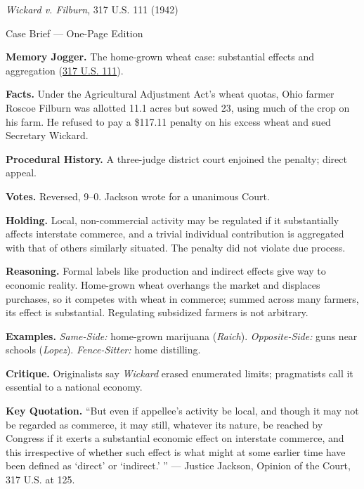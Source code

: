 \documentclass[12pt]{article}
\begin{document}
\begin{center}
{\Large \textit{Wickard v. Filburn}, 317 U.S. 111 (1942)\par}
\vspace{0.3em}
{\normalsize Case Brief --- One-Page Edition\par}
\end{center}

\textbf{Memory Jogger.} The home-grown wheat case: substantial effects and aggregation (\href{https://supreme.justia.com/cases/federal/us/317/111/}{317 U.S. 111}).

\textbf{Facts.} Under the Agricultural Adjustment Act's wheat quotas, Ohio farmer Roscoe Filburn was allotted 11.1 acres but sowed 23, using much of the crop on his farm. He refused to pay a \$117.11 penalty on his excess wheat and sued Secretary Wickard.

\textbf{Procedural History.} A three-judge district court enjoined the penalty; direct appeal.

\textbf{Votes.} Reversed, 9--0. Jackson wrote for a unanimous Court.

\textbf{Holding.} Local, non-commercial activity may be regulated if it substantially affects interstate commerce, and a trivial individual contribution is aggregated with that of others similarly situated. The penalty did not violate due process.

\textbf{Reasoning.} Formal labels like production and indirect effects give way to economic reality. Home-grown wheat overhangs the market and displaces purchases, so it competes with wheat in commerce; summed across many farmers, its effect is substantial. Regulating subsidized farmers is not arbitrary.

\textbf{Examples.} \emph{Same-Side:} home-grown marijuana (\textit{Raich}). \emph{Opposite-Side:} guns near schools (\textit{Lopez}). \emph{Fence-Sitter:} home distilling.

\textbf{Critique.} Originalists say \textit{Wickard} erased enumerated limits; pragmatists call it essential to a national economy.

\textbf{Key Quotation.} ``But even if appellee's activity be local, and though it may not be regarded as commerce, it may still, whatever its nature, be reached by Congress if it exerts a substantial economic effect on interstate commerce, and this irrespective of whether such effect is what might at some earlier time have been defined as `direct' or `indirect.' '' --- Justice Jackson, Opinion of the Court, 317 U.S. at 125.
\end{document}
